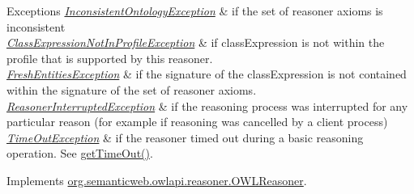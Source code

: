 \begin{DoxyExceptions}{Exceptions}
{\em \hyperlink{classorg_1_1semanticweb_1_1owlapi_1_1reasoner_1_1_inconsistent_ontology_exception}{Inconsistent\-Ontology\-Exception}} & if the set of reasoner axioms is inconsistent \\
\hline
{\em \hyperlink{classorg_1_1semanticweb_1_1owlapi_1_1reasoner_1_1_class_expression_not_in_profile_exception}{Class\-Expression\-Not\-In\-Profile\-Exception}} & if {\ttfamily class\-Expression} is not within the profile that is supported by this reasoner. \\
\hline
{\em \hyperlink{classorg_1_1semanticweb_1_1owlapi_1_1reasoner_1_1_fresh_entities_exception}{Fresh\-Entities\-Exception}} & if the signature of the class\-Expression is not contained within the signature of the set of reasoner axioms. \\
\hline
{\em \hyperlink{classorg_1_1semanticweb_1_1owlapi_1_1reasoner_1_1_reasoner_interrupted_exception}{Reasoner\-Interrupted\-Exception}} & if the reasoning process was interrupted for any particular reason (for example if reasoning was cancelled by a client process) \\
\hline
{\em \hyperlink{classorg_1_1semanticweb_1_1owlapi_1_1reasoner_1_1_time_out_exception}{Time\-Out\-Exception}} & if the reasoner timed out during a basic reasoning operation. See \hyperlink{classorg_1_1semanticweb_1_1owlapi_1_1reasoner_1_1impl_1_1_o_w_l_reasoner_base_af55342eaaabb1b72dacfde7a181b93d2}{get\-Time\-Out()}. \\
\hline
\end{DoxyExceptions}


Implements \hyperlink{interfaceorg_1_1semanticweb_1_1owlapi_1_1reasoner_1_1_o_w_l_reasoner_a1763541bf91b10f9807647e481076eef}{org.\-semanticweb.\-owlapi.\-reasoner.\-O\-W\-L\-Reasoner}.

